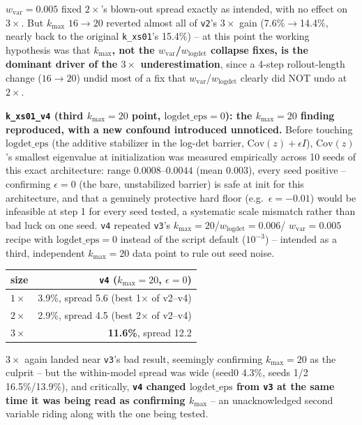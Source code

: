 \documentclass[11pt]{article}
\begin{document}
$w_{\mathrm{var}}{=}0.005$ fixed $2\times$'s blown-out spread exactly as
intended, with no effect on $3\times$. But $k_{\max}$ $16\to20$ reverted
almost all of \texttt{v2}'s $3\times$ gain (7.6\%$\to$14.4\%, nearly back
to the original \texttt{k\_xs01}'s 15.4\%) -- at this point the working
hypothesis was that \textbf{$k_{\max}$, not the $w_{\mathrm{var}}$/$w_{\mathrm{logdet}}$
collapse fixes, is the dominant driver of the $3\times$ underestimation},
since a 4-step rollout-length change ($16\to20$) undid most of a fix
that $w_{\mathrm{var}}$/$w_{\mathrm{logdet}}$ clearly did NOT undo at
$2\times$.

\textbf{\texttt{k\_xs01\_v4} (third $k_{\max}{=}20$ point,
$\mathrm{logdet\_eps}{=}0$): the $k_{\max}{=}20$ finding reproduced, with
a new confound introduced unnoticed.} Before touching
$\mathrm{logdet\_eps}$ (the additive stabilizer in the log-det barrier,
$\mathrm{Cov}(z)+\epsilon I$), $\mathrm{Cov}(z)$'s smallest eigenvalue at
initialization was measured empirically across 10 seeds of this exact
architecture: range $0.0008$--$0.0044$ (mean $0.003$), every seed
positive -- confirming $\epsilon{=}0$ (the bare, unstabilized barrier) is
safe at init for this architecture, and that a genuinely protective hard
floor (e.g.\ $\epsilon{=}-0.01$) would be infeasible at step 1 for every
seed tested, a systematic scale mismatch rather than bad luck on one
seed. \texttt{v4} repeated \texttt{v3}'s $k_{\max}{=}20$/$w_{\mathrm{logdet}}{=}0.006$/
$w_{\mathrm{var}}{=}0.005$ recipe with $\mathrm{logdet\_eps}{=}0$ instead
of the script default ($10^{-3}$) -- intended as a third, independent
$k_{\max}{=}20$ data point to rule out seed noise.

\begin{center}
\begin{tabular}{lr}
\toprule
size & \texttt{v4} ($k_{\max}{=}20$, $\epsilon{=}0$) \\
\midrule
$1\times$ & 3.9\%, spread 5.6 (best 1$\times$ of v2--v4) \\
$2\times$ & 2.9\%, spread 4.5 (best 2$\times$ of v2--v4) \\
$3\times$ & \textbf{11.6\%}, spread 12.2 \\
\bottomrule
\end{tabular}
\end{center}

$3\times$ again landed near \texttt{v3}'s bad result, seemingly
confirming $k_{\max}{=}20$ as the culprit -- but the within-model spread
was wide (seed0 4.3\%, seeds 1/2 16.5\%/13.9\%), and critically,
\textbf{\texttt{v4} changed $\mathrm{logdet\_eps}$ from \texttt{v3} at
the same time it was being read as confirming $k_{\max}$} -- an
unacknowledged second variable riding along with the one being tested.
\end{document}
